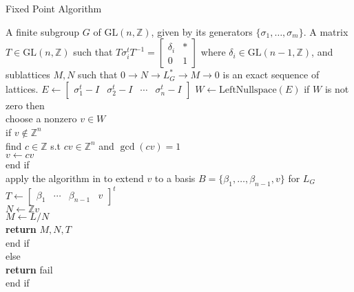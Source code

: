 \documentclass{article}
\theoremstyle{plain}
\theoremstyle{definition}
\newcommand{\Z}{\ensuremath{\mathbb{Z}}}
\begin{document}
\begin{algorithm}[H]
	\caption{Fixed Point Algorithm}
	\label{alg:Fixed Point}
	\begin{algorithmic}[1]
		\REQUIRE A finite subgroup $G$ of $\mathrm{GL}(n,\Z)$, given by its generators $\lbrace \sigma_1, \ldots , \sigma_m \rbrace$.
		\ENSURE A matrix $T \in \mathrm{GL}(n,\Z)$ such that $T \sigma^t_i T^{-1}= \left[ \begin{array}{c|c}
		\delta_i & \ast \\
		\hline 
		0 &1
		\end{array} \right]
		$ where $\delta_i \in \mathrm{GL}(n-1,\Z)$, and sublattices $M, N$ such that $0\longrightarrow N \longrightarrow L^*_G \longrightarrow M \longrightarrow 0$ is an exact sequence of lattices.
		\bigskip
		\STATE $E \gets \left[ \begin{array}{c|c|c|c}
		\sigma^t_1-I & \sigma^t_2 -I & \cdots & \sigma^t_n -I
		\end{array} \right]$
	    \STATE $W \gets \mathrm{LeftNullspace}(E)$
	    \STATE if $W $ is not zero then\\
	    \hspace{0.5in} choose a nonzero $v \in W$\\
	    \hspace{0.5 in} if $v \notin \Z^n$ \\
	    \hspace{1in} find $c \in \Z$ s.t $cv \in \Z^n$ and $\gcd(cv) = 1$\\
	    \hspace{1in} $v \gets cv$\\
	    \hspace{0.5 in} end if\\
	    \hspace{0.5in} apply the algorithm in \cite{LatticeBase} to extend $v$ to a basis $B = \lbrace \beta_1, \ldots, \beta_{n-1},v\rbrace$ for $L_G$\\
	    \hspace{0.5in} $T \gets \begin{bmatrix}
	    \beta_1 &  \cdots &  \beta_{n-1}& v
	    \end{bmatrix}^t$\\
		\hspace{0.5in} $N \gets \Z v$\\
		\hspace{0.5in} $M \gets L/N$\\
		\hspace{0.5in} \textbf{return} $M,N, T$\\
	  \hspace{0.5in} end if\\
	  else\\
	     \hspace{0.5in}  \textbf{return} fail\\
	     end if
	 	\end{algorithmic}
\end{algorithm}
\end{document}
